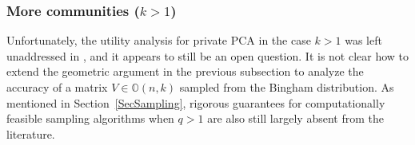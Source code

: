 \documentclass{article}
\newcommand{\real}{\mathbb{R}}
\begin{document}


\subsubsection{More communities ($k > 1$)}

Unfortunately, the utility analysis for private PCA in the case $k > 1$ was left unaddressed in \cite{ChaEtal13}, and it appears to still be an open question. It is not clear how to extend the geometric argument in the previous subsection to analyze the accuracy of a matrix $V \in \mathbb{O}(n,k)$ sampled from the Bingham distribution. As mentioned in Section~\ref{SecSampling}, rigorous guarantees for computationally feasible sampling algorithms when $q > 1$ are also still largely absent from the literature.
\end{document}
